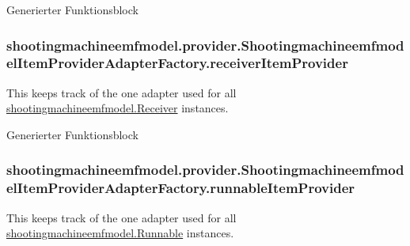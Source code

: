 Generierter Funktionsblock \hypertarget{classshootingmachineemfmodel_1_1provider_1_1_shootingmachineemfmodel_item_provider_adapter_factory_af883b26eb12fa6a5a350b729bd26281c}{
\subsubsection[{receiver\-Item\-Provider}]{ shootingmachineemfmodel.\-provider.\-Shootingmachineemfmodel\-Item\-Provider\-Adapter\-Factory.\-receiver\-Item\-Provider\hspace{0.3cm}{\ttfamily [protected]}}}\label{classshootingmachineemfmodel_1_1provider_1_1_shootingmachineemfmodel_item_provider_adapter_factory_af883b26eb12fa6a5a350b729bd26281c}
This keeps track of the one adapter used for all \hyperlink{interfaceshootingmachineemfmodel_1_1_receiver}{shootingmachineemfmodel.\-Receiver} instances.

Generierter Funktionsblock \hypertarget{classshootingmachineemfmodel_1_1provider_1_1_shootingmachineemfmodel_item_provider_adapter_factory_adc4176dd757971cb6b379a235a4b91eb}{
\subsubsection[{runnable\-Item\-Provider}]{ shootingmachineemfmodel.\-provider.\-Shootingmachineemfmodel\-Item\-Provider\-Adapter\-Factory.\-runnable\-Item\-Provider\hspace{0.3cm}{\ttfamily [protected]}}}\label{classshootingmachineemfmodel_1_1provider_1_1_shootingmachineemfmodel_item_provider_adapter_factory_adc4176dd757971cb6b379a235a4b91eb}
This keeps track of the one adapter used for all \hyperlink{interfaceshootingmachineemfmodel_1_1_runnable}{shootingmachineemfmodel.\-Runnable} instances.

